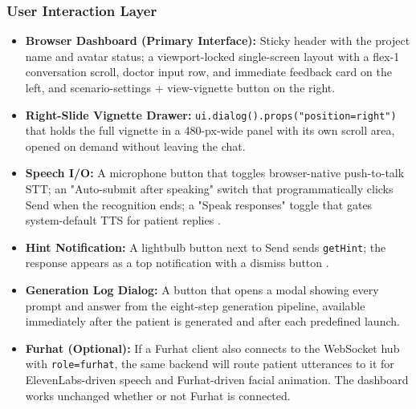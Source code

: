 \documentclass{article}
\begin{document}
\subsubsection{User Interaction Layer}
\begin{itemize}
    \item \textbf{Browser Dashboard (Primary Interface):} Sticky header with the project name and avatar status; a viewport-locked single-screen layout with a flex-1 conversation scroll, doctor input row, and immediate feedback card on the left, and scenario-settings + view-vignette button on the right.

    \item \textbf{Right-Slide Vignette Drawer:} \texttt{ui.dialog().props("position=right")} that holds the full vignette in a 480-px-wide panel with its own scroll area, opened on demand without leaving the chat.

    \item \textbf{Speech I/O:} A microphone button that toggles browser-native push-to-talk STT; an "Auto-submit after speaking" switch that programmatically clicks Send when the recognition ends; a "Speak responses" toggle that gates system-default TTS for patient replies \cite{Mahajan2022TextualDQ}.

    \item \textbf{Hint Notification:} A lightbulb button next to Send sends \texttt{getHint}; the response appears as a top notification with a dismiss button \cite{Krugmann2024SentimentAI}.

    \item \textbf{Generation Log Dialog:} A button that opens a modal showing every prompt and answer from the eight-step generation pipeline, available immediately after the patient is generated and after each predefined launch.

    \item \textbf{Furhat (Optional):} If a Furhat client also connects to the WebSocket hub with \texttt{role=furhat}, the same backend will route patient utterances to it for ElevenLabs-driven speech and Furhat-driven facial animation. The dashboard works unchanged whether or not Furhat is connected.
\end{itemize}
\end{document}
